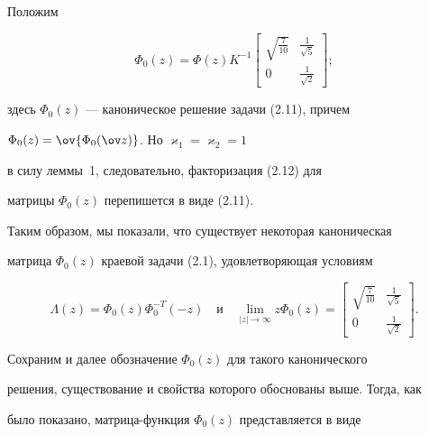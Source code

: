 \begin{pf}
 


Положим 


$$ 


\Phi_0(z)=\Phi(z)K^{-1} 


\begin{bmatrix} 


\sqrt{\frac{7}{10}} & \frac{1}{\sqrt{5}} \\ 


0 & \frac{1}{\sqrt{2}} 


\end{bmatrix};


$$ 


здесь $\Phi_0(z)$ --- каноническое решение задачи (2.11), причем 


$\Phi_0(z)=\ov{\Phi_0(\ov z)}$. Но $\varkappa_1=\varkappa_2=1$


в силу леммы~1, следовательно, факторизация (2.12) для 


матрицы $\Phi_0(z)$ перепишется в виде (2.11). 


\end{pf} 


 


Таким образом, мы показали, что существует некоторая каноническая 


матрица $\Phi_0(z)$ краевой задачи (2.1), удовлетворяющая условиям 


\begin{equation} 


\Lambda(z)=\Phi_0(z)\Phi^{-T}_0(-z)\quad \text{и}\quad 


\lim_{|z|\to\infty}z\Phi_0(z)= 


\begin{bmatrix} 


\sqrt{\frac{7}{10}} & \frac{1}{\sqrt{5}} \\ 


0 & \frac{1}{\sqrt{2}} 


\end{bmatrix}. 


\end{equation} 


 


Сохраним и далее обозначение $\Phi_0(z)$ для такого канонического 


решения, существование и свойства которого обоснованы выше. Тогда, как 


было показано, матрица-функция $\Phi_0(z)$ представляется в виде 


